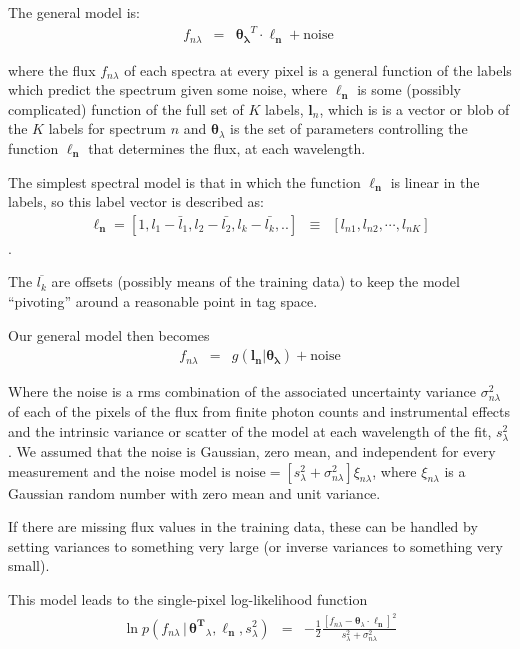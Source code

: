 \documentclass[12pt, preprint]{aastex}
\newcommand{\set}[1]{\bm{#1}}
\newcommand{\mean}[1]{\overline{#1}}
\newcommand{\given}{\,|\,}
\begin{document}
The general model is:
\begin{eqnarray}
f_{n\lambda} &=&
\boldsymbol{\theta_\lambda}^T \cdot \boldsymbol{\ell_n} + \mbox{noise}
\
\end{eqnarray}

where the flux $f_{n\lambda}$ of each spectra at every pixel is a general function of the labels which predict the spectrum given some noise, where $\boldsymbol{\ell_n}$ is some (possibly complicated) function of the full set of $K$ labels, $\set{l}_n$, which is is a vector or blob of the $K$ labels for spectrum $n$ and $\set{\theta}_\lambda$ is the set of parameters controlling the function $\boldsymbol{\ell_n}$ that determines the flux, at each wavelength.

The simplest spectral model is that in which the function $\boldsymbol{\ell_n}$ is
linear in the labels, so this label vector is described as:
\begin{eqnarray}
\set{\ell_n} =  [1, l_1 - \bar{l}_1, l_2 - \bar{l_2}, l_k - \bar{l_k}, .. ] &\equiv& [l_{n1}, l_{n2}, \cdots, l_{nK}]
\label{eq:linear}
\end{eqnarray}.

The $\mean{l_k}$ are offsets (possibly means of the training data) to keep the model ``pivoting'' around a reasonable point in tag space.


Our general model then becomes
\begin{eqnarray}
f_{n\lambda} &=&
g(\boldsymbol{l_n} |  \boldsymbol{\theta_\lambda}) + \mbox{noise}
\end{eqnarray}

Where the noise is a rms combination of the associated uncertainty variance
$\sigma_{n\lambda}^2$ of each of the pixels of the flux from finite photon counts and instrumental effects and the intrinsic variance or scatter of the model at each wavelength of the fit, $s_\lambda^2$. We assumed that the noise is Gaussian, zero mean, and independent for every measurement and the noise model is $\mbox{noise} = [s_\lambda^2+ \sigma_{n\lambda}^2]\xi_{n\lambda}$, where $\xi_{n\lambda}$ is a Gaussian random number with zero mean and unit
variance.

If there are missing flux values in the training data, these can be
handled by setting variances to something very large (or inverse
variances to something very small).

This model leads to the single-pixel log-likelihood function 
\begin{eqnarray}
\ln p(f_{n\lambda}\given\set{\theta^T}_\lambda, \boldsymbol{\ell_n}, s_\lambda^2) &=&
 -\frac{1}{2}\frac{[f_{n\lambda} - \set{\theta}_\lambda \cdot \set{\ell_n}]^2}{s_\lambda^2 + \sigma_{n\lambda}^2}
\label{eq:like}
\end{eqnarray}
\end{document}
